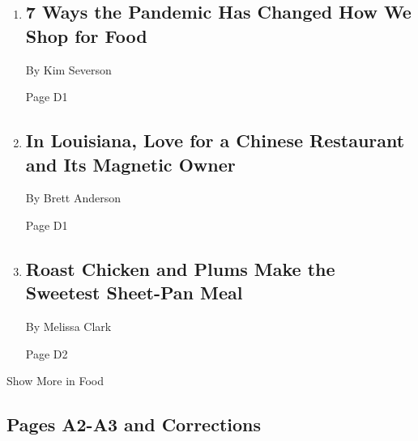 \begin{enumerate}
\def\labelenumi{\arabic{enumi}.}
\item
  \href{/2020/09/08/dining/grocery-shopping-coronavirus.html}{}

  \hypertarget{7-ways-the-pandemic-has-changed-how-we-shop-for-food-1}{%
  \subsection{7 Ways the Pandemic Has Changed How We Shop for
  Food}\label{7-ways-the-pandemic-has-changed-how-we-shop-for-food-1}}

  By Kim Severson

  Page D1
\item
  \href{/2020/09/04/dining/lucky-palace-bossier-city-louisiana-restaurant.html}{}

  \hypertarget{in-louisiana-love-for-a-chinese-restaurant-and-its-magnetic-owner}{%
  \subsection{In Louisiana, Love for a Chinese Restaurant and Its
  Magnetic
  Owner}\label{in-louisiana-love-for-a-chinese-restaurant-and-its-magnetic-owner}}

  By Brett Anderson

  Page D1
\item
  \href{/2020/09/04/dining/sheet-pan-chicken.html}{}

  \hypertarget{roast-chicken-and-plums-make-the-sweetest-sheet-pan-meal}{%
  \subsection{Roast Chicken and Plums Make the Sweetest Sheet-Pan
  Meal}\label{roast-chicken-and-plums-make-the-sweetest-sheet-pan-meal}}

  By Melissa Clark

  Page D2
\end{enumerate}

Show More in Food

\hypertarget{pages-a2-a3-and-corrections}{%
\subsection{Pages A2-A3 and
Corrections}\label{pages-a2-a3-and-corrections}}

